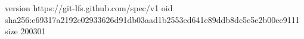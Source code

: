 version https://git-lfs.github.com/spec/v1
oid sha256:e69317a2192c02933626d91db03aad1b2553ed641e89ddb8dc5e5e2b00ee9111
size 200301
